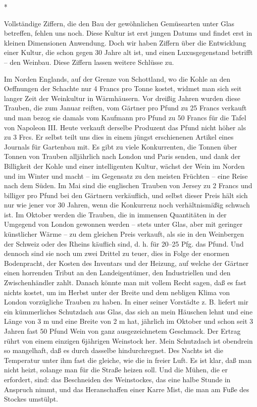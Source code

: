 \documentclass{scrbook}
\begin{document}
\begin{center}*\end{center}

Vollständige Ziffern, die den Bau der gewöhnlichen Gemüsearten unter Glas betreffen, fehlen uns noch. Diese Kultur ist erst jungen Datums und findet erst in kleinen Dimensionen Anwendung. Doch wir haben Ziffern über die Entwicklung einer Kultur, die schon gegen 30 Jahre alt ist, und einen Luxusgegenstand betrifft – den Weinbau. Diese Ziffern lassen weitere Schlüsse zu.

Im Norden Englands, auf der Grenze von Schottland, wo die Kohle an den Oeffnungen der Schachte nur 4 Francs pro Tonne kostet, widmet man sich seit langer Zeit der Weinkultur in Wärmhäusern. Vor dreißig Jahren wurden diese Trauben, die zum Januar reiften, vom Gärtner pro Pfund zu 25 Francs verkauft und man bezog sie damals vom Kaufmann pro Pfund zu 50 Francs für die Tafel von Napoleon III. Heute verkauft derselbe Produzent das Pfund nicht höher als zu 3 Frcs. Er selbst teilt uns dies in einem jüngst erschienenen Artikel eines Journals für Gartenbau mit. Es gibt zu viele Konkurrenten, die Tonnen über Tonnen von Trauben alljährlich nach London und Paris senden, und dank der Billigkeit der Kohle und einer intelligenten Kultur, wächst der Wein im Norden und im Winter und macht – im Gegensatz zu den meisten Früchten – eine Reise nach dem Süden. Im Mai sind die englischen Trauben von Jersey zu 2 Francs und billiger pro Pfund bei den Gärtnern verkäuflich, und selbst dieser Preis hält sich nur wie jener vor 30 Jahren, wenn die Konkurrenz noch verhältnismäßig schwach ist. Im Oktober werden die Trauben, die in immensen Quantitäten in der Umgegend von London gewonnen werden – stets unter Glas, aber mit geringer künstlicher Wärme – zu dem gleichen Preis verkauft, als sie in den Weinbergen der Schweiz oder des Rheins käuflich sind, d. h. für 20–25 Pfg. das Pfund. Und dennoch sind sie noch um zwei Drittel zu teuer, dies in Folge der enormen Bodenpracht, der Kosten des Inventars und der Heizung, auf welche der Gärtner einen horrenden Tribut an den Landeigentümer, den Industriellen und den Zwischenhändler zahlt. Danach könnte man mit vollem Recht sagen, daß es fast nichts kostet, um im Herbst unter der Breite und dem nebligen Klima von London vorzügliche Trauben zu haben. In einer seiner Vorstädte z. B. liefert mir ein kümmerliches Schutzdach aus Glas, das sich an mein Häuschen lehnt und eine Länge von 3 m und eine Breite von 2 m hat, jährlich im Oktober und schon seit 3 Jahren fast 50 Pfund Wein von ganz ausgezeichnetem Geschmack. Der Ertrag rührt von einem einzigen 6jährigen Weinstock her. Mein Schutzdach ist obendrein so mangelhaft, daß es durch dasselbe hindurchregnet. Des Nachts ist die Temperatur unter ihm fast die gleiche, wie die in freier Luft. Es ist klar, daß man nicht heizt, solange man für die Straße heizen soll. Und die Mühen, die er erfordert, sind: das Beschneiden des Weinstockes, das eine halbe Stunde in Anspruch nimmt, und das Heranschaffen einer Karre Mist, die man am Fuße des Stockes umstülpt.
\end{document}
